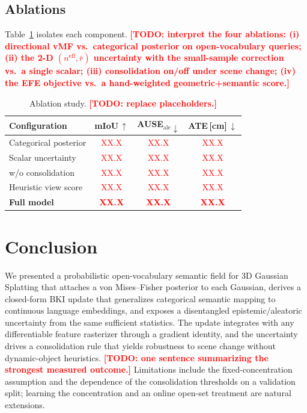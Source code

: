 \documentclass[journal]{IEEEtran}
\newcommand{\todo}[1]{\textcolor{red}{\textbf{[TODO: #1]}}}
\newcommand{\ph}{\textcolor{red}{XX.X}}      %
\begin{document}
\subsection{Ablations}
Table~\ref{tab:abl} isolates each component. \todo{interpret the four ablations:
(i) directional vMF vs.\ categorical posterior on open-vocabulary queries;
(ii) the 2-D $(n^{\mathrm{eff}},\bar r)$ uncertainty with the small-sample
correction vs.\ a single scalar; (iii) consolidation on/off under scene change;
(iv) the EFE objective vs.\ a hand-weighted geometric+semantic score.}

\begin{table}[t]
\centering
\caption{Ablation study. \todo{replace placeholders.}}
\label{tab:abl}
\begin{tabular}{lccc}
\toprule
Configuration & mIoU\,$\uparrow$ & AUSE$_{\mathrm{ale}}\!\downarrow$
& ATE\,[cm]\,$\downarrow$\\
\midrule
Categorical posterior        & \ph & \ph & \ph\\
Scalar uncertainty           & \ph & \ph & \ph\\
w/o consolidation            & \ph & \ph & \ph\\
Heuristic view score         & \ph & \ph & \ph\\
\textbf{Full model}          & \textbf{\ph} & \textbf{\ph} & \textbf{\ph}\\
\bottomrule
\end{tabular}
\end{table}

\section{Conclusion}
We presented a probabilistic open-vocabulary semantic field for 3D Gaussian
Splatting that attaches a von Mises--Fisher posterior to each Gaussian, derives a
closed-form BKI update that generalizes categorical semantic mapping to
continuous language embeddings, and exposes a disentangled epistemic/aleatoric
uncertainty from the same sufficient statistics. The update integrates with any
differentiable feature rasterizer through a gradient identity, and the
uncertainty drives a consolidation rule that yields robustness to scene change
without dynamic-object heuristics. \todo{one sentence summarizing the strongest
measured outcome.} Limitations include the fixed-concentration assumption and
the dependence of the consolidation thresholds on a validation split; learning
the concentration and an online open-set treatment are natural extensions.
\end{document}
